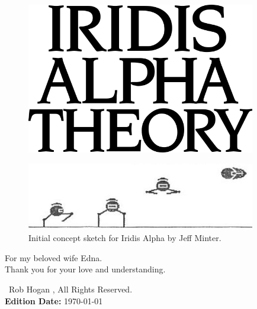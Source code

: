 
\vspace*{\fill}
\begin{figure}[H]
    \centering
      \includegraphics[width=10cm]{src/cover/title_page.png}%
\end{figure}
\vspace*{\fill}
\thispagestyle{empty}%

\clearpage
\vspace*{\fill}
\begin{figure}[H]
    \centering
      \includegraphics[width=10cm]{src/bumph/sketch.png}%
\caption*{Initial concept sketch for Iridis Alpha by Jeff Minter.}
\end{figure}

\vspace*{\fill}
For my beloved wife Edna.\\
Thank you for your love and understanding.\\
\bigskip
\vspace*{\fill}

\textcopyright\ Rob Hogan \the\year{}, All Rights Reserved. \\
\textbf{Edition Date:} \today

\doclicenseThis
\thispagestyle{empty}%
\clearpage
